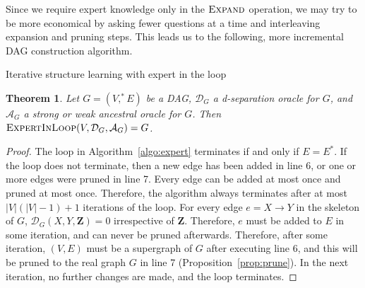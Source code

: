 \documentclass{uai2025} %
\newtheorem{theorem}{Theorem}
\begin{document}
Since we require expert knowledge only in the $\textsc{Expand}$ operation, we may try
to be more economical by asking fewer questions at a time and interleaving expansion and
pruning steps. This leads us to the following, more incremental DAG construction algorithm.

\begin{algorithm}[h]
\DontPrintSemicolon
\SetAlgoLined
{}


\caption{Iterative structure learning with expert in the loop}
\label{algo:expert}
\end{algorithm} 

\begin{theorem}
Let $G=(V,^*E)$ be a DAG, $\mathcal{D}_G$ a d-separation oracle for $G$, and 
$\mathcal{A}_G$ a strong or weak ancestral oracle for $G$. Then 
$\textsc{ExpertInLoop}(V,\mathcal{D}_G,\mathcal{A}_G)=G$.
\end{theorem}

\begin{proof}
The loop in Algorithm~\ref{algo:expert} terminates if and only if $E=E^*$. If the loop does not 
terminate, then a new edge has been added in line 6, or one or more edges were pruned in line 7.
Every edge can be added at 
most once and pruned at most once. Therefore, the algorithm always terminates
after at most $|V|(|V|-1)+1$ iterations of the loop. For every edge $e=X\to Y $ in the skeleton of $G$, $\mathcal{D}_G(X,Y,\mathbf{Z})=0$ irrespective of $\mathbf{Z}$. Therefore, $e$ must be added to $E$ in some iteration, and can never be pruned afterwards. Therefore, after some iteration, $(V,E)$ must be a supergraph of $G$ after executing line 6, and this will be pruned to the real graph $G$ in line 7 (Proposition~\ref{prop:prune}). In the next iteration, no further changes are made, and the loop terminates.
\end{proof} 
\end{document}
